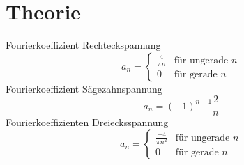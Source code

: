\section{Theorie}
\label{sec:Theorie}
\cite{koeff}
Fourierkoeffizient Rechteckspannung
\begin{equation}
  a_n =
  \begin{cases}
      \frac{4}{\pi n} & \text{für ungerade } n\\
      0 & \text{für gerade } n
  \end{cases}
\end{equation}
Fourierkoeffizient Sägezahnspannung
\begin{equation}
  a_n = (-1)^{n+1}\frac{2}{n}
\end{equation}
Fourierkoeffizienten Dreiecksspannung
\begin{equation}
  a_n =
  \begin{cases}
    \frac{-4}{\pi n^2} & \text{für ungerade }n\\
    0 & \text{für gerade }n
  \end{cases}
\end{equation}
